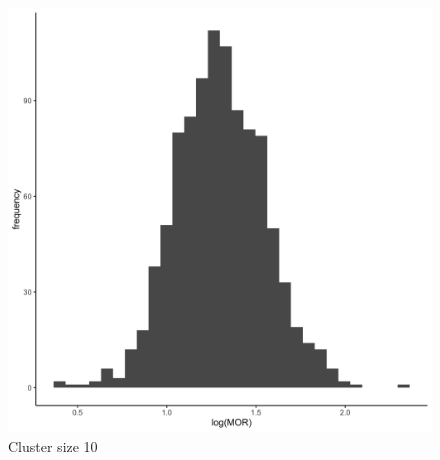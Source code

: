 \documentclass[
  letterpaper,
  DIV=11,
  numbers=noendperiod,
  titlepage]{scrartcl}
\begin{document}
\begin{figure}
\begin{minipage}[t]{0.24\linewidth}
{{\includegraphics{../../plots/two-lvl-ran-slope/high-prev/hist_100_10_two_lvl_slp_high_prev_q1.png}

}

\caption{Cluster size 10}

}

\end{minipage}%
%
\begin{minipage}[t]{0.24\linewidth}

{\centering 

}
\end{minipage}
\end{figure}
\end{document}
